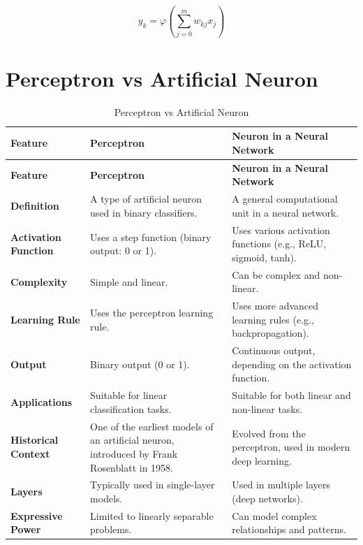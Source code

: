 \[
     y_{k}=\varphi \left(\sum _{j=0}^{m}w_{kj}x_{j}\right)
\]


\section{Perceptron vs Artificial Neuron \cite{chatgpt}}
\begin{longtable}{| m{3cm} | m{6cm} | m{6cm} |}
    \caption{Perceptron vs Artificial Neuron} \\
    \hline
    \textbf{Feature} & \textbf{Perceptron} & \textbf{Neuron in a Neural Network} \\
    \hline
    \endfirsthead
    
    \hline
    \textbf{Feature} & \textbf{Perceptron} & \textbf{Neuron in a Neural Network} \\
    \hline
    \endhead
    
    \hline
    \endfoot
    
    \hline
    \endlastfoot
    
    \textbf{Definition} & A type of artificial neuron used in binary classifiers. & A general computational unit in a neural network. \\
    \hline
    \textbf{Activation Function} & Uses a step function (binary output: 0 or 1). & Uses various activation functions (e.g., ReLU, sigmoid, tanh). \\
    \hline
    \textbf{Complexity} & Simple and linear. & Can be complex and non-linear. \\
    \hline
    \textbf{Learning Rule} & Uses the perceptron learning rule. & Uses more advanced learning rules (e.g., backpropagation). \\
    \hline
    \textbf{Output} & Binary output (0 or 1). & Continuous output, depending on the activation function. \\
    \hline
    \textbf{Applications} & Suitable for linear classification tasks. & Suitable for both linear and non-linear tasks. \\
    \hline
    \textbf{Historical Context} & One of the earliest models of an artificial neuron, introduced by Frank Rosenblatt in 1958. & Evolved from the perceptron, used in modern deep learning. \\
    \hline
    \textbf{Layers} & Typically used in single-layer models. & Used in multiple layers (deep networks). \\
    \hline
    \textbf{Expressive Power} & Limited to linearly separable problems. & Can model complex relationships and patterns. \\
    \hline

\end{longtable}



